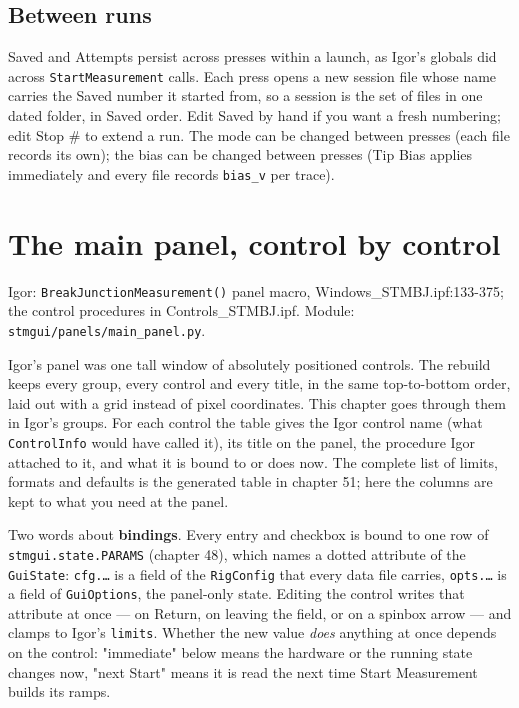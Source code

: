 \section{Between runs}

Saved and Attempts persist across presses within a launch, as Igor's globals did across \texttt{Start\discretionary{}{}{}Measurement} calls. Each press opens a new session file whose name carries the Saved number it started from, so a session is the set of files in one dated folder, in Saved order. Edit Saved by hand if you want a fresh numbering; edit Stop \# to extend a run. The mode can be changed between presses (each file records its own); the bias can be changed between presses (Tip Bias applies immediately and every file records \texttt{bias\_\discretionary{}{}{}v} per trace).

\setcounter{chapter}{41}
\chapter{The main panel, control by control}

\begin{keybox}\small Igor: \texttt{Break\discretionary{}{}{}Junction\discretionary{}{}{}Measurement()} panel macro, Windows\_STMBJ.ipf:133-375; the control procedures in Controls\_STMBJ.ipf. Module: \texttt{stmgui/\discretionary{}{}{}panels/\discretionary{}{}{}main\_\discretionary{}{}{}panel.\discretionary{}{}{}py}.\end{keybox}

Igor's panel was one tall window of absolutely positioned controls. The rebuild keeps every group, every control and every title, in the same top-to-bottom order, laid out with a grid instead of pixel coordinates. This chapter goes through them in Igor's groups. For each control the table gives the Igor control name (what \texttt{Control\discretionary{}{}{}Info} would have called it), its title on the panel, the procedure Igor attached to it, and what it is bound to or does now. The complete list of limits, formats and defaults is the generated table in chapter 51; here the columns are kept to what you need at the panel.

Two words about \textbf{bindings}. Every entry and checkbox is bound to one row of \texttt{stmgui.\discretionary{}{}{}state.\discretionary{}{}{}PARAMS} (chapter 48), which names a dotted attribute of the \texttt{Gui\discretionary{}{}{}State}: \texttt{cfg.\discretionary{}{}{}…} is a field of the \texttt{Rig\discretionary{}{}{}Config} that every data file carries, \texttt{opts.\discretionary{}{}{}…} is a field of \texttt{Gui\discretionary{}{}{}Options}, the panel-only state. Editing the control writes that attribute at once --- on Return, on leaving the field, or on a spinbox arrow --- and clamps to Igor's \texttt{limits}. Whether the new value \emph{does} anything at once depends on the control: "immediate" below means the hardware or the running state changes now, "next Start" means it is read the next time Start Measurement builds its ramps.

